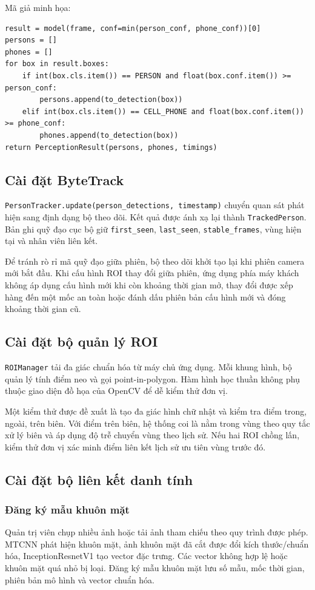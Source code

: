 Mã giả minh họa:
\begin{Verbatim}[fontsize=\small,breaklines=true,breakanywhere=true]
result = model(frame, conf=min(person_conf, phone_conf))[0]
persons = []
phones = []
for box in result.boxes:
    if int(box.cls.item()) == PERSON and float(box.conf.item()) >= person_conf:
        persons.append(to_detection(box))
    elif int(box.cls.item()) == CELL_PHONE and float(box.conf.item()) >= phone_conf:
        phones.append(to_detection(box))
return PerceptionResult(persons, phones, timings)
\end{Verbatim}

\subsection{Cài đặt ByteTrack}
\texttt{PersonTracker.update(person\_detections, timestamp)} chuyển quan sát phát hiện sang định dạng bộ theo dõi. Kết quả được ánh xạ lại thành \texttt{TrackedPerson}. Bản ghi quỹ đạo cục bộ giữ \texttt{first\_seen}, \texttt{last\_seen}, \texttt{stable\_frames}, vùng hiện tại và nhân viên liên kết.

Để tránh rò rỉ mã quỹ đạo giữa phiên, bộ theo dõi khởi tạo lại khi phiên camera mới bắt đầu. Khi cấu hình ROI thay đổi giữa phiên, ứng dụng phía máy khách không áp dụng cấu hình mới khi còn khoảng thời gian mở, thay đổi được xếp hàng đến một mốc an toàn hoặc đánh dấu phiên bản cấu hình mới và đóng khoảng thời gian cũ.

\subsection{Cài đặt bộ quản lý ROI}
\texttt{ROIManager} tải đa giác chuẩn hóa từ máy chủ ứng dụng. Mỗi khung hình, bộ quản lý tính điểm neo và gọi point-in-polygon. Hàm hình học thuần không phụ thuộc giao diện đồ họa của OpenCV để dễ kiểm thử đơn vị.

Một kiểm thử được đề xuất là tạo đa giác hình chữ nhật và kiểm tra điểm trong, ngoài, trên biên. Với điểm trên biên, hệ thống coi là nằm trong vùng theo quy tắc xử lý biên và áp dụng độ trễ chuyển vùng theo lịch sử. Nếu hai ROI chồng lấn, kiểm thử đơn vị xác minh điểm liên kết lịch sử ưu tiên vùng trước đó.

\subsection{Cài đặt bộ liên kết danh tính}
\subsubsection{Đăng ký mẫu khuôn mặt}
Quản trị viên chụp nhiều ảnh hoặc tải ảnh tham chiếu theo quy trình được phép. MTCNN phát hiện khuôn mặt, ảnh khuôn mặt đã cắt được đổi kích thước/chuẩn hóa, InceptionResnetV1 tạo vector đặc trưng. Các vector không hợp lệ hoặc khuôn mặt quá nhỏ bị loại. Đăng ký mẫu khuôn mặt lưu số mẫu, mốc thời gian, phiên bản mô hình và vector chuẩn hóa.

